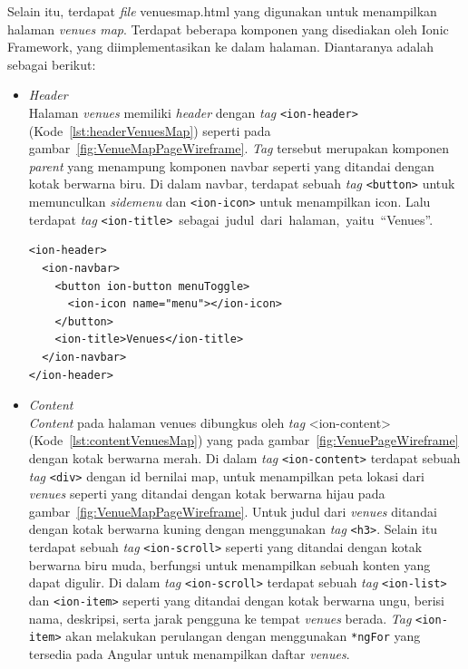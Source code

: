 \begin{enumerate}
	Selain itu, terdapat \textit{file} venues\textunderscore map.html yang digunakan untuk menampilkan halaman \textit{venues map}. Terdapat beberapa komponen yang disediakan oleh Ionic Framework, yang diimplementasikan ke dalam halaman. Diantaranya adalah sebagai berikut:
\newpage
	\begin{itemize}
		\item \textit{Header} \\
		 Halaman \textit{venues} memiliki \textit{header} dengan \textit{tag} \texttt{<ion-header>} (Kode~\ref{lst:headerVenuesMap}) seperti pada gambar~\ref{fig:VenueMapPageWireframe}. \textit{Tag} tersebut merupakan komponen \textit{parent} yang menampung komponen navbar seperti yang ditandai dengan kotak berwarna biru. Di dalam navbar, terdapat sebuah \textit{tag} \texttt{<button>} untuk memunculkan \textit{sidemenu} dan \texttt{<ion-icon>} untuk menampilkan icon. Lalu terdapat \textit{tag} \texttt{<ion-title>}~sebagai~judul~dari~halaman,~yaitu~``Venues''.
		
\begin{lstlisting}[label={lst:headerVenuesMap}, caption=\textit{Header} pada venues\textunderscore map.html]
<ion-header>
  <ion-navbar>
    <button ion-button menuToggle>
      <ion-icon name="menu"></ion-icon>
    </button>
    <ion-title>Venues</ion-title>
  </ion-navbar>
</ion-header>
\end{lstlisting}

		\item \textit{Content} \\
		\textit{Content} pada halaman venues dibungkus oleh \textit{tag} <ion-content> (Kode~\ref{lst:contentVenuesMap}) yang pada gambar~\ref{fig:VenuePageWireframe} dengan kotak berwarna merah. Di dalam \textit{tag} \texttt{<ion-content>} terdapat sebuah \textit{tag} \texttt{<div>} dengan id bernilai map, untuk menampilkan peta lokasi dari \textit{venues} seperti yang ditandai dengan kotak berwarna hijau pada gambar~\ref{fig:VenueMapPageWireframe}. Untuk judul dari \textit{venues} ditandai dengan kotak berwarna kuning dengan menggunakan \textit{tag} \texttt{<h3>}. Selain itu terdapat sebuah \textit{tag} \texttt{<ion-scroll>} seperti yang ditandai dengan kotak berwarna biru muda, berfungsi untuk menampilkan sebuah konten yang dapat digulir. Di dalam \textit{tag} \texttt{<ion-scroll>} terdapat sebuah \textit{tag} \texttt{<ion-list>} dan \texttt{<ion-item>} seperti yang ditandai dengan kotak berwarna ungu, berisi nama, deskripsi, serta jarak pengguna ke tempat \textit{venues} berada. \textit{Tag} \texttt{<ion-item>} akan melakukan perulangan dengan menggunakan \texttt{*ngFor} yang tersedia pada Angular untuk menampilkan daftar \textit{venues}.
		

\end{itemize}
\end{enumerate}

